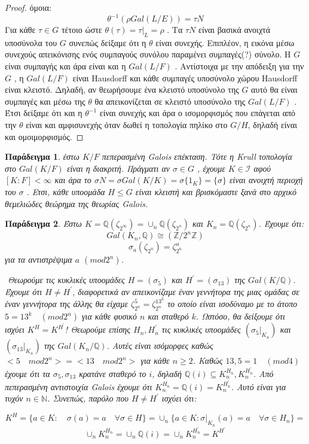 \documentclass[oneside,a4paper]{article}
\newtheorem{example}{Παράδειγμα}
\newcommand {\tl}{\textlatin}
\newcommand{\Z}{\mathbb{Z}}
\newcommand{\Q}{\mathbb{Q}}
\begin{document}
\begin{proof}
όμοια: 
$$\theta^{-1} (\rho Gal(L/E)) = \tau N$$
Για κάθε $\tau \in G$ τέτοιο ώστε $\theta (\tau) = \tau|_L = \rho$ . Τα $\tau N$ είναι βασικά ανοιχτά υποσύνολα του $G$ συνεπώς δείξαμε ότι η $\theta$ είναι συνεχής. Επιπλέον, η εικόνα μέσω συνεχούς απεικόνισης ενός συμπαγούς συνόλου παραμένει συμπαγές(?) σύνολο. H $G$ είναι συμπαγής και άρα είναι και η $Gal(L/F)$ . Αντίστοιχα με την απόδειξη για την $G$ , η $Gal(L/F)$ είναι Hausdorff και κάθε συμπαγές υποσύνολο χώρου Hausdorff είναι κλειστό. Δηλαδή, αν θεωρήσουμε ένα κλειστό υποσύνολο της $G$ αυτό θα είναι συμπαγές και μέσω της $\theta$ θα απεικονίζεται σε κλειστό υποσύνολο της $Gal(L/F)$ . Έτσι δείξαμε ότι και η $\theta^{-1}$ είναι συνεχής και άρα ο ισομορφισμός που επάγεται από την $\theta$ είναι και αμφισυνεχής όταν δωθεί η τοπολογία πηλίκο στο $G/H$, δηλαδή είναι και ομοιμορφισμός.
\end{proof}

\begin{example}
έστω $K/F$ πεπερασμένη Galois επέκταση. Τότε η Krull τοπολογία στο $Gal(K/F)$ είναι η διακριτή. Πράγματι αν $\sigma \in G$ , έχουμε $K\in \mathcal I$ αφού $[K:F]<\infty$ και άρα το $\sigma N = \sigma Gal(K/K) = \sigma \{1_K\} = \{ \sigma\}$ είναι ανοιχτή περιοχή του $\sigma$ . Ετσι, κάθε υποομάδα $H\leq G$ είναι κλειστή και βρισκόμαστε ξανά στο αρχικό θεμελιώδες θεώρημα της θεωρίας Galois.
\end{example}


\begin{example}
	Έστω $K = \mathbb{Q}(\zeta_{2^{\infty}}) = \cup_n \mathbb{Q} (\zeta_{2^n})$ και $K_n = \mathbb{Q}(\zeta_{2^n})$. Έχουμε ότι: 
	$$Gal(K_n,\Q ) \cong (\Z / 2^n \Z )$$
	$$\sigma_a (\zeta_{2^n}) = \zeta^a_{2^n}$$
	για τα αντιστρέψιμα $a$  $(mod2^n)$.

	$ $\newline %
	\noindent Θεωρούμε τις κυκλικές υποομάδες $H = (\sigma_5)$ και $H^{\prime} = (\sigma_{13})$ της $Gal(K/ \Q)$. Έχουμε ότι $H \neq H^{\prime}$, διαφορετικά αν απεικονίζαμε έναν γεννήτορα της μιας ομάδας σε έναν γεννήτορα της άλλης θα είχαμε $\zeta^5_{2^n} = \zeta^{13^k}_{2^n}$ το οποίο είναι ισοδύναμο με το άτοπο $5 = 13^k \quad (mod2^n)$ για κάθε φυσικό $n$ και σταθερό $k$.
	Ωστόσο, θα δείξουμε ότι ισχύει $K^H = K^{H^{\prime}}$! Θεωρούμε επίσης $H_n, H^{\prime}_n$ τις κυκλικές υποομάδες $(\sigma_5|_{K_n} )$ και $(\sigma_{13}|_{K_n})$ της $Gal(K_n / \Q)$. Αυτές είναι ισόμορφες καθώς $<5 \quad mod2^n> = < 13 \quad mod2^n>$ για κάθε $n\geq 2$. Καθώς $13,5 = 1\quad (mod4)$ έχουμε ότι τα $\sigma_5, \sigma_{13}$ κρατάνε σταθερό το $i$, δηλαδή $\Q (i) \subseteq K^{H_n}_n , K^{H^{\prime}_n}_n $. Από πεπερασμένη αντιστοιχία \tl{Galois} έχουμε ότι $K^{H_n}_n = \Q (i) = K^{H^{\prime}_n}_n$. Αυτό είναι για τυχόν $n \in \mathbb N$. Συνεπώς,  παρόλο που $H \neq H^{\prime}$ ισχύει ότι:
	
		$$K^H = \{a \in K : \quad \sigma (a) = a \quad\forall \sigma \in H\} = \cup_n \{a\in K: \sigma|_{K_n} (a) = a \quad\forall \sigma \in H_n\} = $$
		$$\cup_n K^{H_n}_n = \cup_n \Q (i) = \cup_n K^{H^{\prime}_n}_n = K^{H^{\prime}}$$
\end{example}
\end{document}
